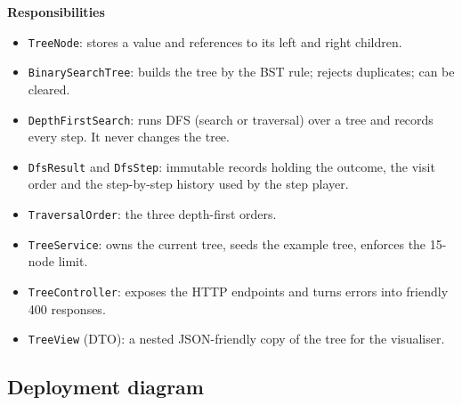 \documentclass[11pt,a4paper]{article}
\newcommand{\code}[1]{\texttt{#1}}
\begin{document}
\textbf{Responsibilities}
\begin{itemize}
  \item \code{TreeNode}: stores a value and references to its left and right children.
  \item \code{BinarySearchTree}: builds the tree by the BST rule; rejects duplicates; can be cleared.
  \item \code{DepthFirstSearch}: runs DFS (search or traversal) over a tree and records every step.
        It never changes the tree.
  \item \code{DfsResult} and \code{DfsStep}: immutable records holding the outcome, the visit order and the
        step-by-step history used by the step player.
  \item \code{TraversalOrder}: the three depth-first orders.
  \item \code{TreeService}: owns the current tree, seeds the example tree, enforces the 15-node limit.
  \item \code{TreeController}: exposes the HTTP endpoints and turns errors into friendly 400 responses.
  \item \code{TreeView} (DTO): a nested JSON-friendly copy of the tree for the visualiser.
\end{itemize}

\subsection{Deployment diagram}
\end{document}
